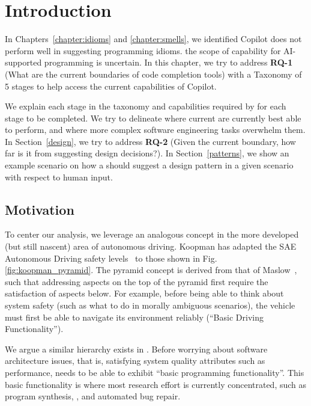\label{chapter:framework}

\section{Introduction}
In Chapters~\ref{chapter:idioms} and \ref{chapter:smells}, we identified Copilot does not perform well in suggesting programming idioms. the scope of capability
for AI-supported programming is uncertain. In this chapter, we try to address \textbf{RQ-1} (What are the current boundaries of code completion tools) with a Taxonomy of 5 stages to help access the current capabilities of Copilot. 

We explain each stage in the taxonomy and capabilities required by \cct{} for each stage to be completed. We try to delineate where current \cct{} are currently best
able to perform, and where more complex software engineering tasks overwhelm them. 
In Section~\ref{design}, we try to address \textbf{RQ-2} (Given the current boundary, how far is it from suggesting design decisions?). In Section~\ref{patterns}, we show an example scenario on how a \cct{} should suggest a design pattern in a given scenario with respect to human input.

\subsection{Motivation}
To center our analysis, we leverage an analogous concept in the more developed (but still nascent) area of autonomous driving. 
Koopman has adapted the SAE Autonomous Driving safety levels~\cite{sae} to those shown in Fig. \ref{fig:koopman_pyramid}. 
The pyramid concept is derived from that of Maslow~\cite{Maslow1943}, such that addressing aspects on the top of the pyramid first require the satisfaction of aspects below. 
For example, before being able to think about system safety (such as what to do in morally ambiguous scenarios), the vehicle must first be able to navigate its environment reliably (``Basic Driving Functionality'').

We argue a similar hierarchy exists in \AISE{}. Before worrying about software architecture issues, that is, satisfying system quality attributes such as performance, \AISE{} needs to be able to exhibit ``basic programming functionality''. This basic functionality is where most research effort is currently concentrated, such as program synthesis, \cct{}, and automated bug repair.

